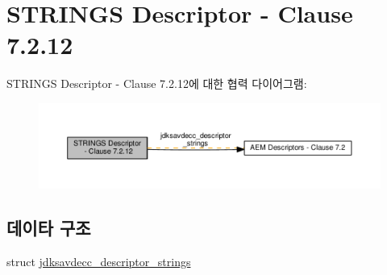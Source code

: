 \hypertarget{group__descriptor__strings}{}\section{S\+T\+R\+I\+N\+GS Descriptor -\/ Clause 7.2.12}
\label{group__descriptor__strings}
S\+T\+R\+I\+N\+GS Descriptor -\/ Clause 7.2.12에 대한 협력 다이어그램\+:
\nopagebreak
\begin{figure}[H]
\begin{center}
\leavevmode
\includegraphics[width=350pt]{group__descriptor__strings}
\end{center}
\end{figure}
\subsection*{데이타 구조}
\begin{DoxyCompactItemize}
\item 
struct \hyperlink{structjdksavdecc__descriptor__strings}{jdksavdecc\+\_\+descriptor\+\_\+strings}
\end{DoxyCompactItemize}
